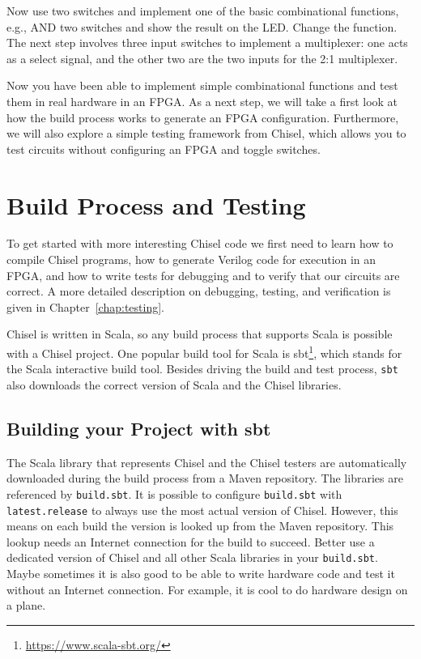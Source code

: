 \documentclass[%
    10pt,
    headinclude, footexclude,
    openright, %
    notitlepage,
    cleardoubleempty,
    headsepline,
    pointlessnumbers,
    bibtotoc, idxtotoc,
    ]{scrbook}
\newcommand{\code}[1]{{\small{\texttt{#1}}}}
\newcommand{\myref}[2]{\href{#1}{#2}}
\renewcommand{\myref}[2]{{#2}{\footnote{\url{#1}}}}
\begin{document}
Now use two switches and implement one of the basic combinational functions,
e.g., AND two switches and show the result on the LED. Change the function.
The next step involves three input switches to implement a multiplexer: one acts as
a select signal, and the other two are the two inputs for the 2:1 multiplexer.

Now you have been able to implement simple combinational functions and test them
in real hardware in an FPGA. As a next step, we will take a first look at how the build
process works to generate an FPGA configuration. Furthermore, we will also
explore a simple testing framework from Chisel, which allows you to test circuits
without configuring an FPGA and toggle switches.

\chapter{Build Process and Testing}

To get started with more interesting Chisel code we first need to learn how to compile
Chisel programs, how to generate Verilog code for execution in an FPGA,
and how to write tests for debugging and to verify that our circuits are correct.
A more detailed description on debugging, testing, and verification is given
in Chapter~\ref{chap:testing}.

Chisel is written in Scala, so any build process that supports Scala is possible
with a Chisel project. One popular build tool for Scala is \myref{https://www.scala-sbt.org/}{sbt},
which stands for the Scala interactive build tool.
Besides driving the build and test process, \code{sbt} also downloads the correct
version of Scala and the Chisel libraries.

\section{Building your Project with sbt}


The Scala library that represents Chisel and the Chisel testers are automatically
downloaded during the build process from a Maven repository.
The libraries are referenced by \code{build.sbt}. It is possible to configure \code{build.sbt}
with \code{latest.release} to always use the most actual version of Chisel.
However, this means on each build the version is looked up from the Maven
repository. This lookup needs an Internet connection for the build to succeed.
Better use a dedicated version of Chisel and all other Scala libraries in your \code{build.sbt}.
Maybe sometimes it is also good to be able to write hardware code and test it without an Internet connection.
For example, it is cool to do hardware design on a plane.
\end{document}
